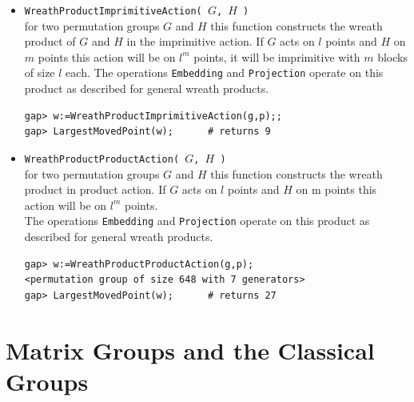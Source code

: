 \documentclass[11pt]{amsart}
\theoremstyle{plain}
\newcommand{\codesize}{\footnotesize}
\newcommand{\<}{\ensuremath{\langle}}
\renewcommand{\>}{\ensuremath{\rangle}}
\begin{document}
\begin{itemize}
{\begin{verbatim}
\end{verbatim}}
\item {\tt WreathProductImprimitiveAction( $G$, $H$ )}\\
for two permutation groups $G$ and $H$ this function constructs the wreath product of $G$ and $H$ in the
imprimitive action. If $G$ acts on $l$ points and $H$ on $m$ points this action will
be on $l^m$ points, it will be imprimitive with $m$ blocks of size $l$ each.
The operations {\tt Embedding} and {\tt Projection} operate on this product as described for general wreath products.
{\codesize
\begin{verbatim}
gap> w:=WreathProductImprimitiveAction(g,p);;
gap> LargestMovedPoint(w);      # returns 9

\end{verbatim}}
\item {\tt WreathProductProductAction( $G$, $H$ )}\\
for two permutation groups $G$ and $H$ this function constructs the wreath product in
product action. If $G$ acts on $l$ points and $H$ on m points this action will be on
$l^m$ points.
\\[4pt]
The operations {\tt Embedding} and {\tt Projection} operate on this product as described for general wreath products.
{\codesize
\begin{verbatim}
gap> w:=WreathProductProductAction(g,p);
<permutation group of size 648 with 7 generators>
gap> LargestMovedPoint(w);      # returns 27
\end{verbatim}}
\end{itemize}

\newpage

\section{Matrix Groups and the Classical Groups}
\end{document}

